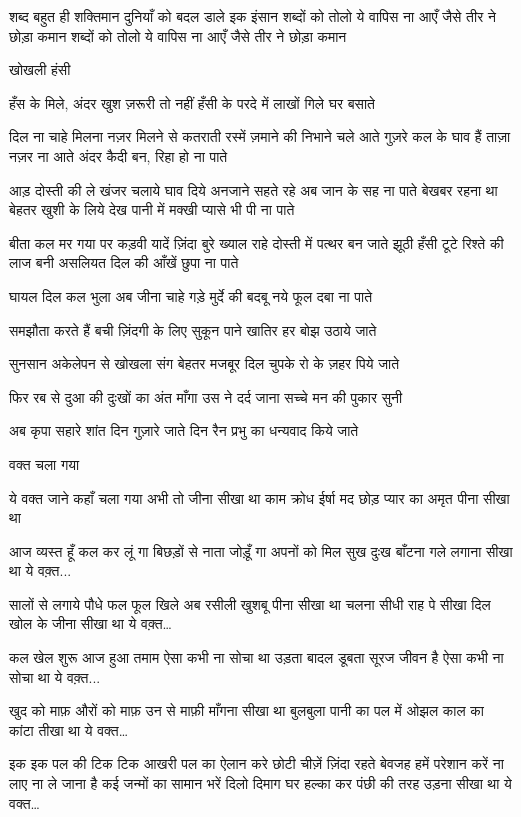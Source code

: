 शब्द बहुत ही शक्तिमान
दुनियाँ को बदल डाले इक इंसान
शब्दों को तोलो ये वापिस ना आएँ
जैसे तीर ने छोड़ा कमान
शब्दों को तोलो ये वापिस ना आएँ
जैसे तीर ने छोड़ा कमान

खोखली हंसी

हँस के मिले, अंदर खुश ज़रूरी तो नहीं
हँसी के परदे में लाखों गिले घर बसाते

दिल ना चाहे मिलना नज़र मिलने से कतराती
रस्में ज़माने की निभाने चले आते
गुज़रे कल के घाव हैं ताज़ा नज़र ना आते
अंदर कैदी बन, रिहा हो ना पाते

आड़ दोस्ती की ले खंजर चलाये घाव दिये
अनजाने सहते रहे अब जान के सह ना पाते
बेखबर रहना था बेहतर खुशी के लिये
देख पानी में मक्खी प्यासे भी पी ना पाते

बीता कल मर गया पर कड़वी यादें ज़िंदा
बुरे ख्याल राहे दोस्ती में पत्थर बन जाते
झूठी हँसी टूटे रिश्ते की लाज बनी
असलियत दिल की आँखें छुपा ना पाते

घायल दिल कल भुला अब जीना चाहे
गड़े मुर्दे की बदबू नये फूल दबा ना पाते

समझौता करते हैं बची ज़िंदगी के लिए
सुकून पाने खातिर हर बोझ उठाये जाते

सुनसान अकेलेपन से खोखला संग बेहतर
मजबूर दिल चुपके रो के ज़हर पिये जाते



फिर रब से दुआ की दुःखों का अंत माँगा
उस ने दर्द जाना सच्चे मन की पुकार सुनी

अब कृपा सहारे शांत दिन गुज़ारे जाते
दिन रैन प्रभु का धन्यवाद किये जाते

वक्त चला गया

ये वक्त जाने कहाँ चला गया
अभी तो जीना सीखा था
काम क्रोध ईर्षा मद छोड़
प्यार का अमृत पीना सीखा था





आज व्यस्त हूँ कल कर लूं गा
बिछड़ों से नाता जोड़ूँ गा
अपनों को मिल सुख दुःख बाँटना
गले लगाना सीखा था
ये वक़्त...

सालों से लगाये पौधे फल फूल खिले
अब रसीली खुशबू पीना सीखा था
चलना सीधी राह पे सीखा
दिल खोल के जीना सीखा था
ये वक़्त…

कल खेल शुरू आज हुआ तमाम
ऐसा कभी ना सोचा था
उड़ता बादल
डूबता सूरज जीवन है 
ऐसा कभी ना सोचा था
ये वक़्त...



खुद को माफ़ औरों को माफ़
उन से माफ़ी माँगना सीखा था
बुलबुला पानी का पल में ओझल
काल का कांटा तीखा था
ये वक्त…

इक इक पल की टिक टिक
आखरी पल का ऐलान करे
छोटी चीज़ें ज़िंदा रहते
बेवजह हमें परेशान करें
ना लाए ना ले जाना है
कई जन्मों का सामान भरें
दिलो दिमाग घर हल्का कर
पंछी की तरह उड़ना सीखा था
ये वक्त…

